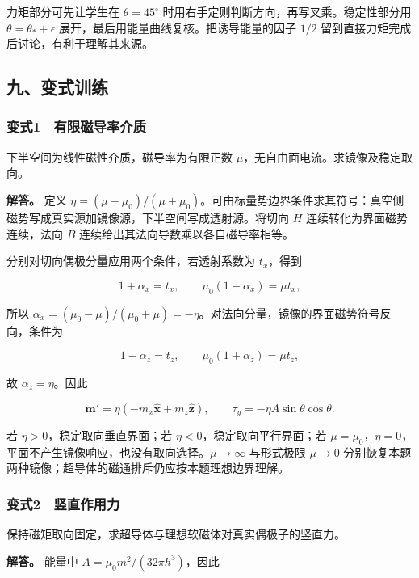 \documentclass[12pt,a4paper,fontset=fandol]{ctexart}
\begin{document}
力矩部分可先让学生在 \(\theta=45^\circ\)
时用右手定则判断方向，再写叉乘。稳定性部分用
\(\theta=\theta_*+\epsilon\) 展开，最后用能量曲线复核。把诱导能量的因子
\(1/2\) 留到直接力矩完成后讨论，有利于理解其来源。

\subsection{九、变式训练}\label{ux4e5dux53d8ux5f0fux8badux7ec3-2}

\subsubsection{变式1　有限磁导率介质}\label{ux53d8ux5f0f1-ux6709ux9650ux78c1ux5bfcux7387ux4ecbux8d28}

下半空间为线性磁性介质，磁导率为有限正数
\(\mu\)，无自由面电流。求镜像及稳定取向。

\textbf{解答。} 定义
\(\eta=(\mu-\mu_0)/(\mu+\mu_0)\)。可由标量势边界条件求其符号：真空侧磁势写成真实源加镜像源，下半空间写成透射源。将切向
\(H\) 连续转化为界面磁势连续，法向 \(B\)
连续给出其法向导数乘以各自磁导率相等。

分别对切向偶极分量应用两个条件，若透射系数为 \(t_x\)，得到

\[
1+\alpha_x=t_x,\qquad \mu_0(1-\alpha_x)=\mu t_x,
\]

所以
\(\alpha_x=(\mu_0-\mu)/(\mu_0+\mu)=-\eta\)。对法向分量，镜像的界面磁势符号反向，条件为

\[
1-\alpha_z=t_z,\qquad \mu_0(1+\alpha_z)=\mu t_z,
\]

故 \(\alpha_z=\eta\)。因此

\[
\boldsymbol m'=\eta(-m_x\hat{\boldsymbol x}+m_z\hat{\boldsymbol z}),
\qquad \tau_y=-\eta A\sin\theta\cos\theta.
\]

若 \(\eta>0\)，稳定取向垂直界面；若 \(\eta<0\)，稳定取向平行界面；若
\(\mu=\mu_0\)，\(\eta=0\)，平面不产生镜像响应，也没有取向选择。\(\mu\to\infty\)
与形式极限 \(\mu\to0\)
分别恢复本题两种镜像；超导体的磁通排斥仍应按本题理想边界理解。

\subsubsection{变式2　竖直作用力}\label{ux53d8ux5f0f2-ux7ad6ux76f4ux4f5cux7528ux529b}

保持磁矩取向固定，求超导体与理想软磁体对真实偶极子的竖直力。

\textbf{解答。} 能量中 \(A=\mu_0m^2/(32\pi h^3)\)，因此
\end{document}
